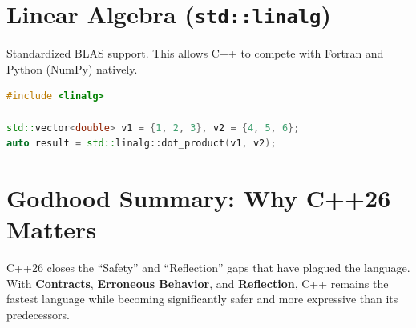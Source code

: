 \section{Linear Algebra (\texttt{std::linalg})}

Standardized BLAS support. This allows C++ to compete with Fortran and Python (NumPy) natively.

\begin{lstlisting}[language=C++]
#include <linalg>

std::vector<double> v1 = {1, 2, 3}, v2 = {4, 5, 6};
auto result = std::linalg::dot_product(v1, v2);
\end{lstlisting}

\section{Godhood Summary: Why C++26 Matters}
C++26 closes the ``Safety'' and ``Reflection'' gaps that have plagued the language. With \textbf{Contracts}, \textbf{Erroneous Behavior}, and \textbf{Reflection}, C++ remains the fastest language while becoming significantly safer and more expressive than its predecessors.

